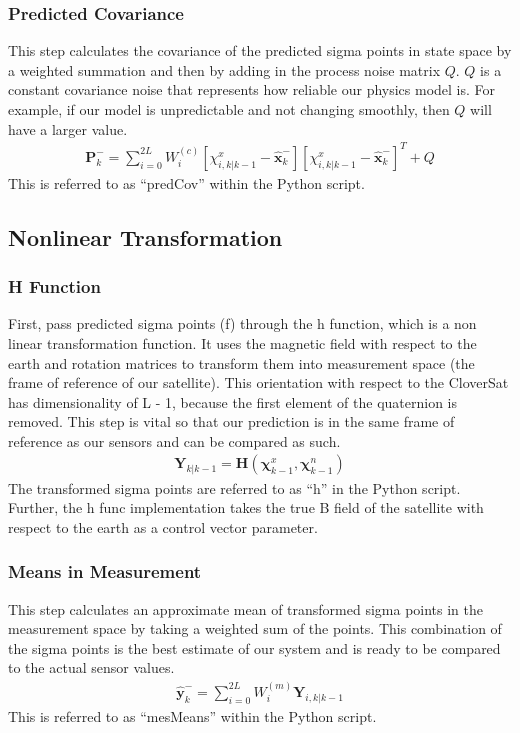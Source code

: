 \documentclass{article}
\newcommand{\x}{\mathbf{x}}
\newcommand{\Cov}{\mathbf{P}}
\newcommand{\chivec}{\mathbf{\chi}}
\renewcommand{\H}{\mathbf{H}}
\newcommand{\Y}{\mathbf{Y}}
\newcommand{\y}{\mathbf{y}}
\begin{document}
\subsubsection{Predicted Covariance}
This step calculates the covariance of the predicted sigma points in state space by a weighted summation and then by adding in the process noise matrix $Q$. $Q$ is a constant covariance noise that represents how reliable our physics model is. For example, if our model is unpredictable and not changing smoothly, then $Q$ will have a larger value. 
\begin{align}
    \Cov_k^{-} = \sum_{i = 0}^{2L} W_{i}^{(c)} \left[ \chi^{x}_{i, k|k-1} - \hat{\x}_k^{-} \right] \left[ \chi^{x}_{i, k|k-1} - \hat{\x}_k^{-} \right]^{T} + Q \label{eq:predCov}
\end{align}
This is referred to as ``predCov'' within the Python script.

\subsection{Nonlinear Transformation}
\subsubsection{H Function}
First, pass predicted sigma points (f) through the h function, which is a non linear transformation function. It uses the magnetic field with respect to the earth and rotation matrices to transform them into measurement space (the frame of reference of our satellite). This orientation with respect to the CloverSat has dimensionality of L - 1, because the first element of the quaternion is removed. This step is vital so that our prediction is in the same frame of reference as our sensors and can be compared as such. 
\begin{align}
    \Y_{k|k-1} = \H(\chivec_{k-1}^{x}, \chivec_{k-1}^{n}) \label{eq:hfunc}
\end{align}
The transformed sigma points are referred to as ``h'' in the Python script. Further, the h func implementation takes the true B field of the satellite with respect to the earth as a control vector parameter.

\subsubsection{Means in Measurement}
This step calculates an approximate mean of transformed sigma points in the measurement space by taking a weighted sum of the points. This combination of the sigma points is the best estimate of our system and is ready to be compared to the actual sensor values. 
\begin{align}
    \hat{\y}_k^{-} = \sum_{i = 0}^{2L} W_i^{(m)} \Y_{i, k|k-1} \label{eq:mesMeans}
\end{align}
This is referred to as ``mesMeans'' within the Python script.
\end{document}
